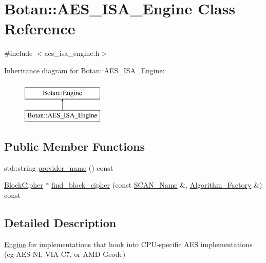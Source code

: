 \hypertarget{classBotan_1_1AES__ISA__Engine}{\section{Botan\-:\-:A\-E\-S\-\_\-\-I\-S\-A\-\_\-\-Engine Class Reference}
\label{classBotan_1_1AES__ISA__Engine}
}


{\ttfamily \#include $<$aes\-\_\-isa\-\_\-engine.\-h$>$}

Inheritance diagram for Botan\-:\-:A\-E\-S\-\_\-\-I\-S\-A\-\_\-\-Engine\-:\begin{figure}[H]
\begin{center}
\leavevmode
\includegraphics[height=2.000000cm]{classBotan_1_1AES__ISA__Engine}
\end{center}
\end{figure}
\subsection*{Public Member Functions}
\begin{DoxyCompactItemize}
\item 
std\-::string \hyperlink{classBotan_1_1AES__ISA__Engine_a81315d87a28d7ca9952483a5c757be4c}{provider\-\_\-name} () const 
\item 
\hyperlink{classBotan_1_1BlockCipher}{Block\-Cipher} $\ast$ \hyperlink{classBotan_1_1AES__ISA__Engine_a076f58d05865f318402d84c4cf0160bb}{find\-\_\-block\-\_\-cipher} (const \hyperlink{classBotan_1_1SCAN__Name}{S\-C\-A\-N\-\_\-\-Name} \&, \hyperlink{classBotan_1_1Algorithm__Factory}{Algorithm\-\_\-\-Factory} \&) const 
\end{DoxyCompactItemize}


\subsection{Detailed Description}
\hyperlink{classBotan_1_1Engine}{Engine} for implementations that hook into C\-P\-U-\/specific A\-E\-S implementations (eg A\-E\-S-\/\-N\-I, V\-I\-A C7, or A\-M\-D Geode) 

